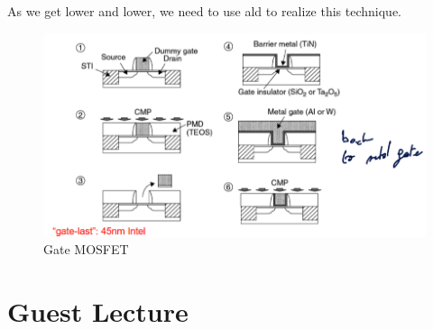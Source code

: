 \documentclass{report}
\begin{document}
As we get lower and lower, we need to use \gls{ald} to realize this technique.

\begin{figure}[H]
    \centering
    \includegraphics[width=0.5\linewidth]{gate_MOSFET.png}
    \caption{Gate MOSFET}
    \label{fig:enter-label}
\end{figure}



\chapter{Guest Lecture}

\glsaddall

\printglossary[type=\acronymtype, title=Acronyms]
\printglossary[type=definitions, title=Technical Definitions]
\end{document}
